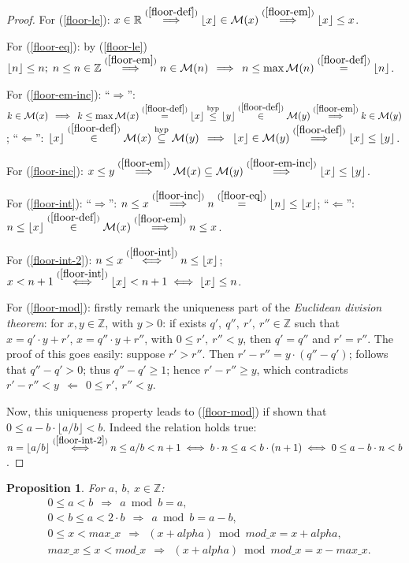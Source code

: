 \documentclass[a4paper,9pt,leqno]{article}
\renewcommand{\=}{\protect\nobreakdash-\hspace{0pt}}
\renewcommand{\~}{\protect\nobreakdash--\hspace{0pt}}
\theoremstyle{plain}
\newtheorem{prop}[fact]{Proposition}
\theoremstyle{definition}
\theoremstyle{remark}
\newcommand{\floor}[1]{\lfloor#1\rfloor}
\newcommand{\rimpl}{\:\:\Longleftarrow\:\:}
\newcommand{\impll}{\:\:\Longrightarrow\:\:}
\newcommand{\impl}{\impll}%
\newcommand{\iffl}{\:\:\Longleftrightarrow\:\:}
\newcommand{\qimpl}{``$\Rightarrow$''}
\newcommand{\qrimpl}{``$\Leftarrow$''}
\newcommand{\parref}[1]{(\ref{#1})}
\newcommand{\by}[1]{{#1}}
\newcommand{\byhyp}{\by{hyp}}
\newcommand{\symby}[2]{\stackrel{#1}{{#2}}}
\newcommand{\symbyrm}[2]{\symby{{\rm\scriptstyle{#1}}}{#2}}
\newcommand{\implby}[1]{\symbyrm{#1}{\impll}}
\newcommand{\implbyref}[1]{\implby{\parref{#1}}}
\newcommand{\iffby}[1]{\symbyrm{#1}{\iffl}}
\newcommand{\iffbyref}[1]{\iffby{\parref{#1}}}
\newcommand{\eqby}[1]{\symbyrm{#1}{=}}
\newcommand{\eqbyref}[1]{\eqby{\parref{#1}}}
\newcommand{\leby}[1]{\symbyrm{#1}{\le}}
\newcommand{\lebyhyp}{\leby{\byhyp}}
\newcommand{\gt}{>}
\newcommand{\lt}{<}
\newcommand{\inby}[1]{\symbyrm{#1}{\in}}
\newcommand{\inbyref}[1]{\inby{\parref{#1}}}
\newcommand{\sseteqby}[1]{\symbyrm{#1}{\subseteq}}
\newcommand{\sseteqbyhyp}{\sseteqby{\byhyp}}
\newcommand{\mc}{,\:}
\newcommand\Int{\mathbb{Z}}
\newcommand\Int*{\mathbb{Z}^*}
\newcommand\Real{\mathbb{R}}
\newcommand\Real*{\mathbb{R}^*}
\begin{document}
\begin{proof}
For \parref{floor-le}: $x \in \Real \implbyref{floor-def} \floor{x} \in \mathcal{M}(x)
\implbyref{floor-em} \floor{x} \le x$.

For \parref{floor-eq}: by \parref{floor-le} $\floor{n} \le n;\;
n \le n \in \Int \implbyref{floor-em} n \in \mathcal{M}(n)
\impl n \le \max\mathcal{M}(n) \eqbyref{floor-def} \floor{n}$.

For \parref{floor-em-inc}: \qimpl: $k \in \mathcal{M}(x)
\impl k \le \max \mathcal{M}(x) 
\eqbyref{floor-def} \floor{x} \lebyhyp \floor{y}
\inbyref{floor-def} \mathcal{M}(y)
\implbyref{floor-em} k \in \mathcal{M}(y)$; \qrimpl: $\floor{x}
\inbyref{floor-def} \mathcal{M}(x) \sseteqbyhyp \mathcal{M}(y)
\impl \floor{x} \in \mathcal{M}(y)
\implbyref{floor-def} \floor{x} \le \floor{y}$.

For \parref{floor-inc}: $x \le y
\implbyref{floor-em} \mathcal{M}(x) \subseteq \mathcal{M}(y)
\implbyref{floor-em-inc} \floor{x} \le \floor{y}$.

For \parref{floor-int}: \qimpl: $n \le x
\implbyref{floor-inc} n \eqbyref{floor-eq} \floor{n} \le \floor{x}$;
\qrimpl: $n \le \floor{x} \inbyref{floor-def} \mathcal{M}(x)
\implbyref{floor-em} n \le x$.

For \parref{floor-int-2}: $n \le x \iffbyref{floor-int} n \le \floor{x}$;
$x \lt n + 1 \iffbyref{floor-int} \floor{x} \lt n + 1 \iff \floor{x} \le n$.

For \parref{floor-mod}: firstly remark the uniqueness part of the
\emph{Euclidean division theorem}: for $x, y \in \Int$, with $y \gt 0$: if
exists $q' \mc q'' \mc r' \mc r'' \in \Int$ such that $x = q' \cdot y + r'$, 
$x = q'' \cdot y + r''$, with $0 \le r' \mc r'' \lt y$, then $q' = q''$ and $r' = r''$.
The proof of this goes easily: suppose $r' \gt r''$. Then $r' - r'' = y \cdot
(q'' - q')$; follows that $q'' - q' \gt 0$; thus $q'' - q' \ge 1$;
hence $r' - r'' \ge y$, which contradicts
$r' - r'' \lt y \rimpl 0 \le r' \mc r'' \lt y$.

Now, this uniqueness property leads to \parref{floor-mod} if
shown that $0 \le a - b \cdot \floor{a / b} \lt b$. Indeed the relation holds true:
$n = \floor{a / b} \iffbyref{floor-int-2} n \le a / b \lt n + 1
\iff b \cdot n \le a \lt b \cdot (n + 1)
\iff 0 \le a - b \cdot n \lt b$.
\end{proof}

\begin{prop}
For $a \mc b \mc x \in \Int$:
\begin{align}
& 0 \le a \lt b \impl a \bmod b = a,                       \label{a-mod-b-eq-a}\\
%
& 0 \lt b \le a \lt 2 \cdot b \impl a \bmod b = a - b,     \label{a-mod-b-eq-a-minus-b}\\
%
& 0 \le x \lt max\_x \impl (x + alpha) \bmod mod\_x = x + alpha,
                                                           \label{x-alpha-mod-x-lt}\\
%
& max\_x \le x \lt mod\_x \impl (x + alpha) \bmod mod\_x = x - max\_x.
                                                           \label{x-alpha-mod-x-ge}
\end{align}
\end{prop}
\end{document}
